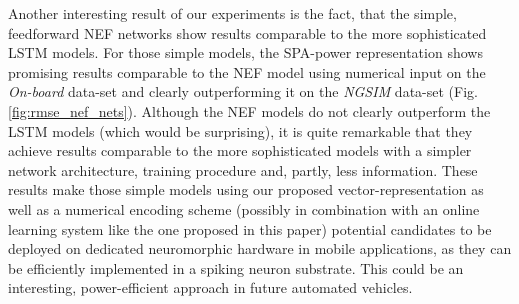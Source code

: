Another interesting result of our experiments is the fact, that the simple, feedforward \ac{NEF} networks show results comparable to the more sophisticated \ac{LSTM} models.
For those simple models, the \ac{SPA}-power representation shows promising results comparable to the \ac{NEF} model using numerical input on the \emph{On-board} data-set and clearly outperforming it on the \emph{\ac{NGSIM}} data-set (Fig. \ref{fig:rmse_nef_nets}).
Although the \ac{NEF} models do not clearly outperform the \ac{LSTM} models (which would be surprising), it is quite remarkable that they achieve results comparable to the more sophisticated models with a simpler network architecture, training procedure and, partly, less information.
These results make those simple models using our proposed vector-representation as well as a numerical encoding scheme (possibly in combination with an online learning system like the one proposed in this paper) potential candidates to be deployed on dedicated neuromorphic hardware in mobile applications, as they can be efficiently implemented in a spiking neuron substrate.
This could be an interesting, power-efficient approach in future automated vehicles.

